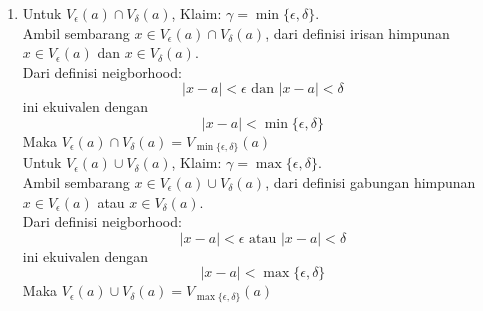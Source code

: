 \documentclass{article}
\begin{document}
\begin{enumerate}[leftmargin=*, label={\arabic*}.]
\item Untuk $V_\epsilon (a)\cap V_\delta(a)$, Klaim: $\gamma = \min\{\epsilon, \delta\}$.\\
Ambil sembarang $x \in V_\epsilon (a)\cap V_\delta(a)$, dari definisi irisan himpunan $x \in V_\epsilon (a)$ dan $x \in V_\delta(a)$.\\
Dari definisi neigborhood:
\[
    |x-a| < \epsilon \text{ dan } |x-a| < \delta
\]
ini ekuivalen dengan 
\[
    |x-a| < \min\{\epsilon, \delta\}
\]
Maka $V_\epsilon (a)\cap V_\delta(a) = V_{\min\{\epsilon, \delta\}}(a)$\\

Untuk $V_\epsilon (a)\cup V_\delta(a)$, Klaim: $\gamma = \max\{\epsilon, \delta\}$.\\
Ambil sembarang $x \in V_\epsilon (a)\cup V_\delta(a)$, dari definisi gabungan himpunan $x \in V_\epsilon (a)$ atau $x \in V_\delta(a)$.\\
Dari definisi neigborhood:
\[
    |x-a| < \epsilon \text{ atau } |x-a| < \delta
\]
ini ekuivalen dengan 
\[
    |x-a| < \max\{\epsilon, \delta\}
\]
Maka $V_\epsilon (a)\cup V_\delta(a) = V_{\max\{\epsilon, \delta\}}(a)$


\end{enumerate}
\end{document}
